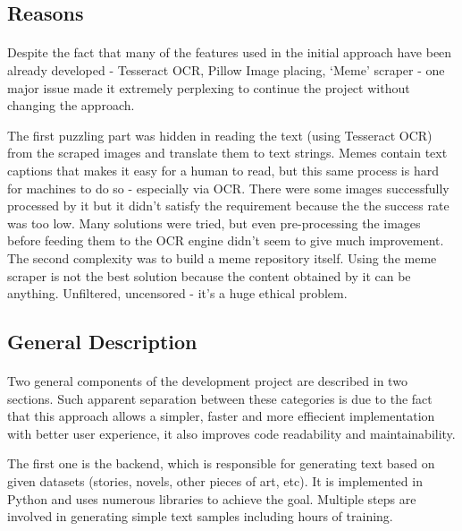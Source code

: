 \documentclass[12pt]{report}
\begin{document}
\clearpage

\subsection*{Reasons}
\paragraph{}
Despite the fact that many of the features used in the initial approach have been already developed - Tesseract OCR, 
Pillow Image placing, `Meme' scraper - one major issue made it extremely perplexing to continue the project without changing the approach.

The first puzzling part was hidden in reading the text (using Tesseract OCR) from the scraped images and translate them to text strings.
Memes contain text captions that makes it easy for a human to read, but this same process is hard for machines to do so - 
especially via OCR. There were some images successfully processed by it but it didn't satisfy the requirement because the the success rate was too low.
Many solutions were tried, but even pre-processing the images before feeding them to the OCR engine didn't seem to give much improvement.
The second complexity was to build a meme repository itself. Using the meme scraper is not the best solution because
the content obtained by it can be anything. Unfiltered, uncensored - it's a huge ethical problem.

\subsection*{General Description}
\paragraph{}
Two general components of the development project are described in two sections. Such apparent separation between these categories 
is due to the fact that this approach allows a simpler, faster and more effiecient implementation with better user
experience, it also improves code readability and maintainability.

The first one is the backend, which is responsible for generating text based on given datasets 
(stories, novels, other pieces of art, etc). It is implemented in Python and uses numerous libraries
to achieve the goal. Multiple steps are involved in generating simple text samples including hours of training.
\end{document}
